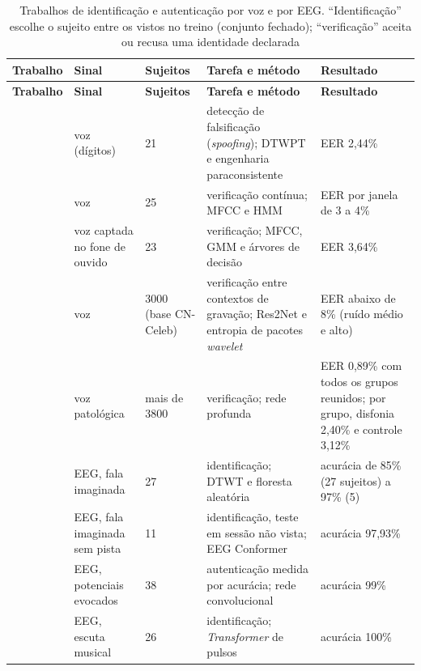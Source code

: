 			{\footnotesize
			\tableZebraStripe
			\begin{longtable}{@{}Y{0.14\textwidth}Y{0.15\textwidth}Y{0.09\textwidth}Y{0.26\textwidth}Y{0.24\textwidth}@{}}
				\caption[Trabalhos de identificação e autenticação por voz e por EEG]{Trabalhos de identificação e autenticação por voz e por \ac{EEG}. ``Identificação'' escolhe o sujeito entre os vistos no treino (conjunto fechado); ``verificação'' aceita ou recusa uma identidade declarada} \label{tab:estadoDaArte} \\
				\tableHeaderRow \textbf{Trabalho} & \textbf{Sinal} & \textbf{Sujeitos} & \textbf{Tarefa e método} & \textbf{Resultado} \\
				\endfirsthead
				\tableHeaderRow \textbf{Trabalho} & \textbf{Sinal} & \textbf{Sujeitos} & \textbf{Tarefa e método} & \textbf{Resultado} \\
				\endhead
				\bottomrule
				\endlastfoot
				 & voz (dígitos) & 21 & detecção de falsificação (\textit{spoofing}); \ac{DTWPT} e engenharia paraconsistente & \ac{EER} 2,44\% \\
				 & voz & 25 & verificação contínua; MFCC e HMM & \ac{EER} por janela de 3 a 4\% \\
				 & voz captada no fone de ouvido & 23 & verificação; MFCC, GMM e árvores de decisão & \ac{EER} 3,64\% \\
				 & voz & 3000 (base CN-Celeb) & verificação entre contextos de gravação; Res2Net e entropia de pacotes \textit{wavelet} & \ac{EER} abaixo de 8\% (ruído médio e alto) \\
				 & voz patológica & mais de 3800 & verificação; rede profunda & \ac{EER} 0,89\% com todos os grupos reunidos; por grupo, disfonia 2,40\% e controle 3,12\% \\
				 & \ac{EEG}, fala imaginada & 27 & identificação; \ac{DTWT} e floresta aleatória & acurácia de 85\% (27 sujeitos) a 97\% (5) \\
				 & \ac{EEG}, fala imaginada sem pista & 11 & identificação, teste em sessão não vista; EEG Conformer & acurácia 97,93\% \\
				 & \ac{EEG}, potenciais evocados & 38 & autenticação medida por acurácia; rede convolucional & acurácia 99\% \\
				 & \ac{EEG}, escuta musical & 26 & identificação; \textit{Transformer} de pulsos & acurácia 100\% \\

\end{longtable}}
